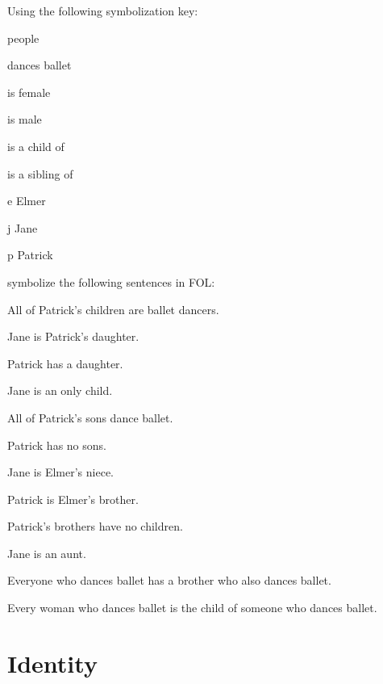 \solutions
\problempart
\label{pr.FOLballet}
Using the following symbolization key:
\begin{ekey}
\item[\text{domain}] people
\item[\atom{D}{x}]  dances ballet
\item[\atom{F}{x}]  is female
\item[\atom{M}{x}]  is male
\item[\atom{C}{x,y}]  is a child of 
\item[\atom{S}{x,y}]  is a sibling of 
\item[e] Elmer
\item[j] Jane
\item[p] Patrick
\end{ekey}
symbolize the following sentences in FOL:
\begin{compactlist}
\item All of Patrick's children are ballet dancers.
\item Jane is Patrick's daughter.
\item Patrick has a daughter.
\item Jane is an only child.
\item All of Patrick's sons dance ballet.
\item Patrick has no sons.
\item Jane is Elmer's niece.
\item Patrick is Elmer's brother.
\item Patrick's brothers have no children.
\item Jane is an aunt.
\item Everyone who dances ballet has a brother who also dances ballet.
\item Every woman who dances ballet is the child of someone who dances ballet.
\end{compactlist}


\chapter{Identity}
\label{sec.identity}

